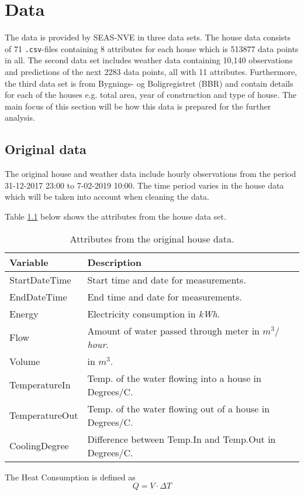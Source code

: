 \chapter{Data}
The data is provided by SEAS-NVE in three data sets. The house data consists of 71 \texttt{.csv}-files containing 8 attributes for each house which is 513877 data points in all. The second data set includes weather data containing 10,140 observations and predictions of the next 2283 data points, all with 11 attributes. Furthermore, the third data set is from Bygnings- og Boligregistret (BBR) and contain details for each of the houses e.g. total area, year of construction and type of house. 
The main focus of this section will be how this data is prepared for the further analysis. 

\section{Original data}
The original house and weather data include hourly observations from the period 31-12-2017 23:00 to 7-02-2019 10:00. The time period varies in the house data which will be taken into account when cleaning the data. 

\noindent Table \ref{tab: housedata} below shows the attributes from the house data set. 
\begin{table}[H]
    \centering
    \begin{tabular}{ll}
     \hline
     \textbf{Variable} & \textbf{Description} \\
    \hline
    \hline
    StartDateTime  &  Start time and date for measurements.\\
    EndDateTime  &  End time and date for measurements.\\
    Energy  &  Electricity consumption in \textit{kWh}.\\
    Flow  &  Amount of water passed through meter in \textit{$m^3/$hour}.\\
    Volume & in $m^3$.\\
    TemperatureIn  &  Temp. of the water flowing into a house in Degrees/C. \\
    TemperatureOut  & Temp. of the water flowing out of a house in Degrees/C.\\
    CoolingDegree  &  Difference between Temp.In and Temp.Out in Degrees/C. \\
    \hline
    \end{tabular}
    \caption{Attributes from the original house data.}
    \label{tab: housedata}
\end{table}
The Heat Consumption is defined as 
\begin{equation}
    Q = V\cdot \Delta T
    \label{eq: Q_heat}
\end{equation}

